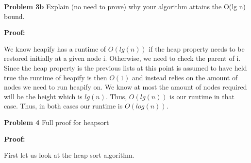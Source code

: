 \documentclass[12pt]{article}
\begin{document}
\rightline{$\blacksquare$}

\par


\par
\bigskip
{\bf Problem
    3b
}
Explain (no need to prove) why your algorithm attains the O(lg n) bound.

\par
\bigskip
{\bf Proof:}
\par
\hline
We know heapify has a runtime of $O(lg(n))$ if the heap property 
needs to be restored initially at a given node i. Otherwise, 
we need to check the parent of i. Since the heap property is the 
previous lists at this point is assumed to have held true the 
runtime of heapify is then $O(1)$ and instead relies on the 
amount of nodes we need to run heapify on. We know at most 
the amount of nodes required will be the height which is $lg(n)$.
Thus, $O(lg(n))$ is our runtime in that case. Thus, in both cases 
our runtime is $O(log(n))$.\\

\rightline{$\blacksquare$}

\par

\par
\bigskip
{\bf Problem
    4
}
Full proof for heapsort
\par
\bigskip
{\bf Proof:}
\par
First let us look at the heap sort algorithm.\\
\end{document}

